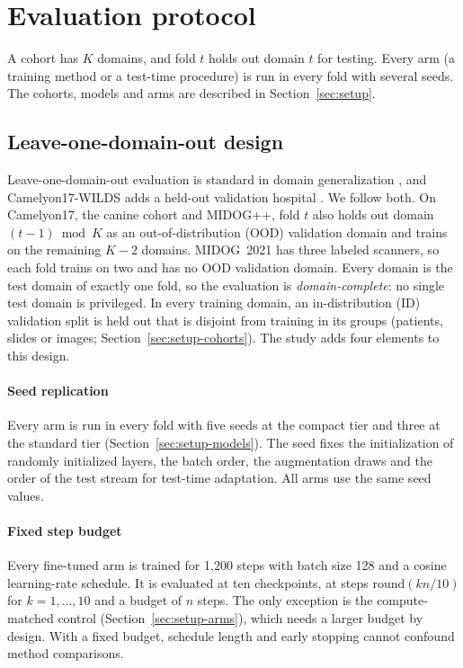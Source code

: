 \section{Evaluation protocol}
\label{sec:protocol}

A cohort has $K$ domains, and fold $t$ holds out domain $t$ for testing. Every
arm (a training method or a test-time procedure) is run in every fold with
several seeds. The cohorts, models and arms are described in
Section~\ref{sec:setup}.

\subsection{Leave-one-domain-out design}
\label{sec:protocol-lodo}

Leave-one-domain-out evaluation is standard in domain generalization
\citep{gulrajani2021domainbed}, and Camelyon17-WILDS adds a held-out validation
hospital \citep{koh2021wilds}. We follow both. On Camelyon17, the canine
cohort and MIDOG++, fold $t$ also holds out domain $(t-1)\bmod K$ as an
out-of-distribution (OOD) validation domain and trains on the remaining $K-2$
domains. MIDOG~2021 has three labeled scanners, so each fold trains on two and
has no OOD validation domain. Every domain is the test domain of exactly one
fold, so the evaluation is \emph{domain-complete}: no single test domain is
privileged. In every training domain, an in-distribution (ID) validation split
is held out that is disjoint from training in its groups (patients, slides or
images; Section~\ref{sec:setup-cohorts}). The study adds four elements to this
design.

\paragraph{Seed replication} Every arm is run in every fold with five seeds at
the compact tier and three at the standard tier
(Section~\ref{sec:setup-models}). The seed fixes the initialization of
randomly initialized layers, the batch order, the augmentation draws and the
order of the test stream for test-time adaptation. All arms use the same seed
values.

\paragraph{Fixed step budget} Every fine-tuned arm is trained for 1,200 steps
with batch size 128 and a cosine learning-rate schedule. It is evaluated at
ten checkpoints, at steps $\mathrm{round}(kn/10)$ for $k=1,\dots,10$ and a
budget of $n$ steps. The only exception is the compute-matched control
(Section~\ref{sec:setup-arms}), which needs a larger budget by design. With a
fixed budget, schedule length and early stopping cannot confound method
comparisons.

